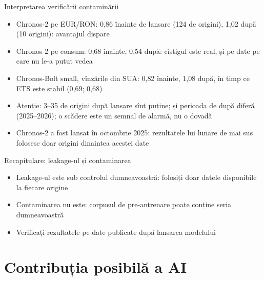\begin{frame}{Interpretarea verificării contaminării}
\itemsize{\footnotesize}
\begin{itemize}
    \item Chronos-2 pe EUR/RON: 0{,}86 înainte de lansare (124 de origini), 1{,}02 după (10 origini): avantajul dispare
    \item Chronos-2 pe consum: 0{,}68 înainte, 0{,}54 după: cîștigul este real, și pe date pe care nu le-a putut vedea
    \item Chronos-Bolt small, vînzările din SUA: 0{,}82 înainte, 1{,}08 după, în timp ce ETS este stabil (0{,}69; 0{,}68)
    \item Atenție: 3--35 de origini după lansare sînt puține; și perioada de după diferă (2025--2026); o scădere este un semnal de alarmă, nu o dovadă
    \item Chronos-2 a fost lansat în octombrie 2025: rezultatele lui lunare de mai sus folosesc doar origini dinaintea acestei date
\end{itemize}
\end{frame}

\begin{frame}{Recapitulare: leakage-ul și contaminarea}
\itemsize{\small}
\begin{itemize}
    \item Leakage-ul este sub controlul dumneavoastră: folosiți doar datele disponibile la fiecare origine
    \item Contaminarea nu este: corpusul de pre-antrenare poate conține seria dumneavoastră
    \item Verificați rezultatele pe date publicate după lansarea modelului
\end{itemize}
\end{frame}


\section{Contribuția posibilă a AI}

